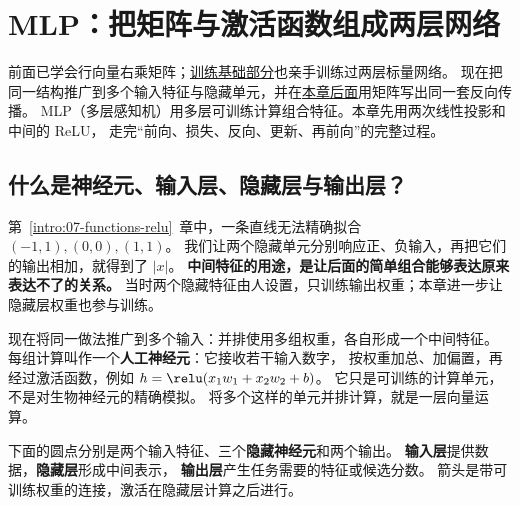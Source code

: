 \chapterrule
\section{MLP：把矩阵与激活函数组成两层网络}
\label{concept:mlp}
\label{intro:10-mlp}

前面已学会行向量右乘矩阵；\hyperref[part:learning]{训练基础部分}也亲手训练过两层标量网络。
现在把同一结构推广到多个输入特征与隐藏单元，并在\hyperref[sec:mlp-matrix-gradient]{本章后面}用矩阵写出同一套反向传播。
MLP（多层感知机）用多层可训练计算组合特征。本章先用两次线性投影和中间的 ReLU，
走完“前向、损失、反向、更新、再前向”的完整过程。

\subsection{什么是神经元、输入层、隐藏层与输出层？}
\label{concept:neuron}

第~\ref*{intro:07-functions-relu}~章中，一条直线无法精确拟合 $(-1,1),(0,0),(1,1)$。
我们让两个隐藏单元分别响应正、负输入，再把它们的输出相加，就得到了 $|x|$。
\textbf{中间特征的用途，是让后面的简单组合能够表达原来表达不了的关系。}
当时两个隐藏特征由人设置，只训练输出权重；本章进一步让隐藏层权重也参与训练。

现在将同一做法推广到多个输入：并排使用多组权重，各自形成一个中间特征。
每组计算叫作一个\textbf{人工神经元}：它接收若干输入数字，
按权重加总、加偏置，再经过激活函数，例如
$h=\relu(x_1w_1+x_2w_2+b)$。
它只是可训练的计算单元，不是对生物神经元的精确模拟。
将多个这样的单元并排计算，就是一层向量运算。

下面的圆点分别是两个输入特征、三个\textbf{隐藏神经元}和两个输出。
\textbf{输入层}提供数据，\textbf{隐藏层}形成中间表示，
\textbf{输出层}产生任务需要的特征或候选分数。
箭头是带可训练权重的连接，激活在隐藏层计算之后进行。

